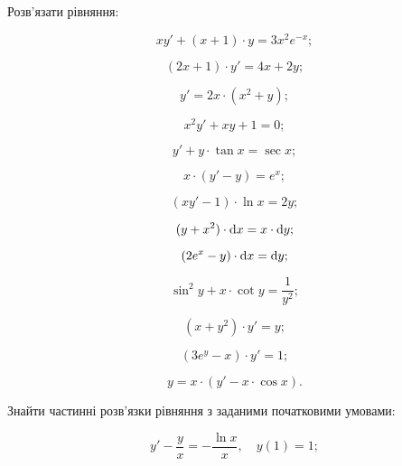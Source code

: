 Розв'язати рівняння:
\begin{multicols}{2}
	\begin{problem}
		\[x y' + (x + 1) \cdot y = 3 x^2 e^{-x};\]
	\end{problem}
	
	\begin{problem}
		\[(2x + 1) \cdot y' =4x+2y;\]
	\end{problem}
	
	\begin{problem}
		\[y'=2x\cdot(x^2+y);\]
	\end{problem}
	
	\begin{problem}
		\[x^2y'+xy+1=0;\]
	\end{problem}
	
	\begin{problem}
		\[y'+y\cdot\tan x=\sec x;\]
	\end{problem}
	
	\begin{problem}
		\[x\cdot(y'-y)=e^x;\]
	\end{problem}
	
	\begin{problem}
		\[(xy'-1)\cdot\ln x=2y;\]
	\end{problem}
	
	\begin{problem}
		\[(y+x^2)\cdot \mathop{}\!\mathrm{d} x=x \cdot\mathop{}\!\mathrm{d} y;\]
	\end{problem}
	
	\begin{problem}
		\[(2e^x-y)\cdot\mathop{}\!\mathrm{d} x=\mathop{}\!\mathrm{d} y;\]
	\end{problem}
	
	\begin{problem}
		\[\sin^2 y + x \cdot \cot y = \frac1{y^2};\]
	\end{problem}
	
	\begin{problem}
		\[(x+y^2)\cdot y'=y;\]
	\end{problem}
	
	\begin{problem}
		\[(3e^y-x)\cdot y' = 1;\]
	\end{problem}
	
	\begin{problem}
		\[y = x\cdot(y'- x \cdot \cos x).\]
	\end{problem}
\end{multicols}

Знайти частинні розв'язки рівняння з заданими початковими умовами:
\begin{problem}
	\[y'-\frac yx=-\frac{\ln x}x, \quad y(1)=1;\]
\end{problem}

